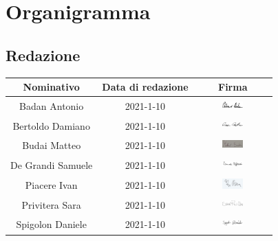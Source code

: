 \section{Organigramma}
\subsection{Redazione}
\begin{table}[H]
	\centering
	\renewcommand{\arraystretch}{1.5}
	\begin{tabular}{|c|c|c|}
		\hline
		\rowcolor{lighter-grayer}
		Nominativo & Data di redazione & Firma \\
		\hline
		Badan Antonio & 2021-1-10 & \includegraphics[width=0.3\textwidth, height=5mm]{res/images/firma1}\\
		\hline
		Bertoldo Damiano & 2021-1-10 & \includegraphics[width=0.3\textwidth, height=5mm]{res/images/firma2} \\
		\hline
		Budai Matteo & 2021-1-10 & \includegraphics[width=0.3\textwidth, height=5mm]{res/images/firma3} \\
		\hline
		De Grandi Samuele & 2021-1-10 &  \includegraphics[width=0.3\textwidth, height=5mm]{res/images/firma4}\\
		\hline
		Piacere Ivan & 2021-1-10 & \includegraphics[width=0.3\textwidth, height=5mm]{res/images/firma5} \\
		\hline
		Privitera Sara & 2021-1-10 & \includegraphics[width=0.3\textwidth, height=5mm]{res/images/firma6}\\
		\hline
		Spigolon Daniele & 2021-1-10 & \includegraphics[width=0.3\textwidth, height=5mm]{res/images/firma7} \\
		\hline
	\end{tabular}
\end{table}

